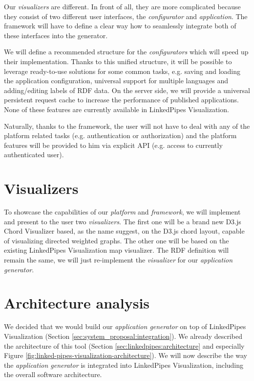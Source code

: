 Our \emph{visualizers} are different. In front of all, they are more complicated because they consist of two different user interfaces, the \emph{configurator} and \emph{application}. The framework will have to define a clear way how to seamlessly integrate both of these interfaces into the generator.

We will define a recommended structure for the \emph{configurators} which will speed up their implementation. Thanks to this unified structure, it will be possible to leverage ready-to-use solutions for some common tasks, e.g. saving and loading the application configuration, universal support for multiple languages and adding/editing labels of RDF data. On the server side, we will provide a universal persistent request cache to increase the performance of published applications. None of these features are currently available in LinkedPipes Visualization.

Naturally, thanks to the framework, the user will not have to deal with any of the platform related tasks (e.g. authentication or authorization) and the platform features will be provided to him via explicit API (e.g. access to currently authenticated user).

\section{Visualizers}

To showcase the capabilities of our \emph{platform} and \emph{framework}, we will implement and present to the user two \emph{visualizers}. The first one will be a brand new D3.js Chord Visualizer based, as the name suggest, on the D3.js chord layout, capable of visualizing directed weighted graphs. The other one will be based on the existing LinkedPipes Visualization map visualizer. The RDF definition will remain the same, we will just re-implement the \emph{visualizer} for our \emph{application generator}.

\section{Architecture analysis}
\label{sec:system-proposal:architecture-analysis}

We decided that we would build our \emph{application generator} on top of LinkedPipes Visualization (Section \ref{sec:system_proposal:integration}). We already described the architecture of this tool (Section \ref{sec:linkedpipes:architecture} and especially Figure \ref{fig:linked-pipes-visualization-architecture}). We will now describe the way the \emph{application generator} is integrated into LinkedPipes Visualization, including the overall software architecture.

